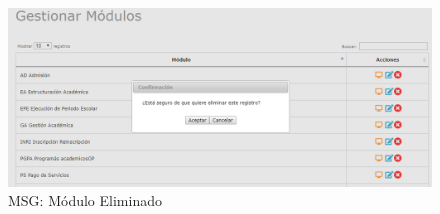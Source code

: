 \begin{enumerate}
			\begin{figure}[htbp!]
				\begin{center}
					\includegraphics[scale=0.6]{roles/lider/modulos/pantallas/IU5-3MSG10}
					\caption{MSG: Módulo Eliminado}
					\label{fig:moduloEliminado}
				\end{center}
			\end{figure}
			\end{enumerate}